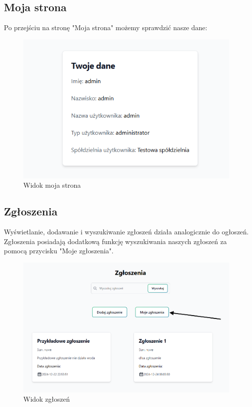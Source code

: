 \subsection{Moja strona}
Po przejściu na stronę "Moja strona" możemy sprawdzić nasze dane:
\begin{figure}[H]
    \centering
    \includegraphics[width=0.75\linewidth]{img/my_page.png}
    \caption{Widok moja strona}
    \label{fig:my_page_view}
\end{figure}
\subsection{Zgłoszenia}
Wyświetlanie, dodawanie i wyszukiwanie zgłoszeń działa analogicznie do ogłoszeń. Zgłoszenia posiadają dodatkową funkcję wyszukiwania naszych zgłoszeń za pomocą przycisku "Moje zgłoszenia".
\begin{figure}[H]
    \centering
    \includegraphics[width=0.75\linewidth]{img/moje_zgloszenia.png}
    \caption{Widok zgłoszeń}
    \label{fig:req-view}
\end{figure}
